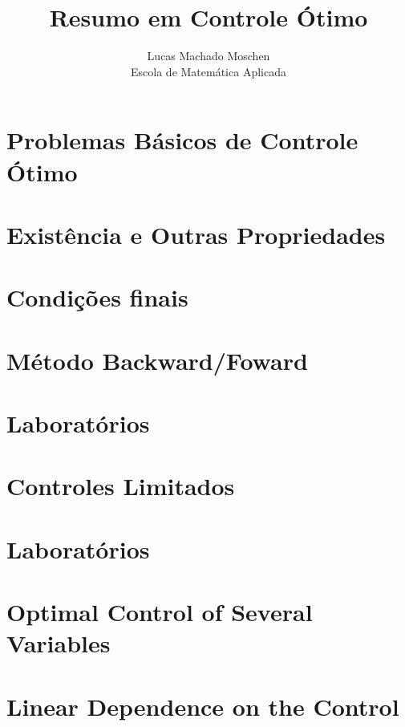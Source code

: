 \documentclass[12pt]{article}
\begin{document}
\newcommand{\e}{\epsilon}
\newcommand{\la}{\lambda}

\title{Resumo em Controle Ótimo}
\author{Lucas Machado Moschen\\ 
Escola de Matemática Aplicada}

\maketitle

\doublespacing
\section{Problemas Básicos de Controle Ótimo}


\section{Existência e Outras Propriedades}


\section{Condições finais}


\section{Método Backward/Foward}


\section{Laboratórios}


\section{Controles Limitados}


\section{Laboratórios}


\section{Optimal Control of Several Variables}


\section{Linear Dependence on the Control}

\end{document}
